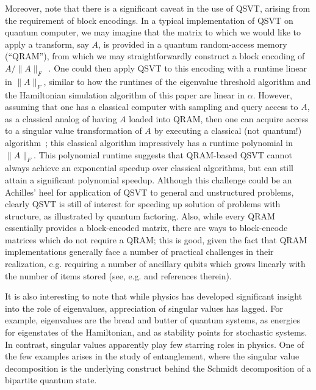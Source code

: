 \documentclass[aps,pra,showpacs,notitlepage,twocolumn,superscriptaddress,nofootinbib]{revtex4-1}
\begin{document}
    Moreover, note that there is a significant caveat in the use of QSVT, arising from the requirement of block encodings. In a typical implementation of QSVT on quantum computer, we may imagine that the matrix to which we would like to apply a transform, say $A$, is provided in a quantum random-access memory (``QRAM''), from which we may straightforwardly construct a block encoding of $A/\|A\|_F$~\cite{Gily_n_2019}. One could then apply QSVT to this encoding with a runtime linear in $\|A\|_F$, similar to how the runtimes of the eigenvalue threshold algorithm and the Hamiltonian simulation algorithm of this paper are linear in $\alpha$. However, assuming that one has a classical computer with sampling and query access to $A$, as a classical analog of having $A$ loaded into QRAM, then one can acquire access to a singular value transformation of $A$ by executing a classical (not quantum!) algorithm~\cite{Chia_2020}; this classical algorithm impressively has a runtime polynomial in $\|A\|_F$. This polynomial runtime suggests that QRAM-based QSVT cannot always achieve an exponential speedup over classical algorithms, but can still attain a significant polynomial speedup. Although this challenge could be an Achilles' heel for application of QSVT to general and unstructured problems, clearly QSVT is still of interest for speeding up solution of problems with structure, as illustrated by quantum factoring.  Also, while every QRAM essentially provides a block-encoded matrix, there are ways to block-encode matrices which do not require a QRAM; this is good, given the fact that QRAM implementations generally face a number of practical challenges in their realization, e.g. requiring a number of ancillary qubits which grows linearly with the number of items stored (see, e.g. \cite{HannLeeGirvinJiang2021a} and references therein).
    
    It is also interesting to note that while physics has developed significant insight into the role of eigenvalues, appreciation of singular values has lagged.  For example, eigenvalues are the bread and butter of quantum systems, as energies for eigenstates of the Hamiltonian, and as stability points for stochastic systems.  In contrast, singular values apparently play few starring roles in physics.  One of the few examples arises in the study of entanglement, where the singular value decomposition is the underlying construct behind the Schmidt decomposition of a bipartite quantum state.  
    
\end{document}
